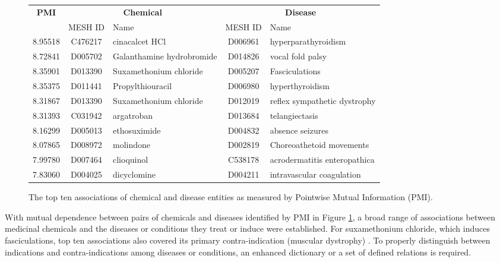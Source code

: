 \documentclass[10pt, oneside]{article}
\begin{document}
\begin{figure}[h]
\begin{center}
\fontsize{9}{11}\selectfont
\begin{tabular}{|*{2}{c|}p{4.5cm}|c|p{4.5cm}|}\hline
 \multirow{2}{*}{\textbf{PMI}} & \multicolumn{2}{c|}{\textbf{Chemical}} & \multicolumn{2}{c|}{\textbf{Disease}} \\ \cline{2-5}
 & MESH ID   & Name                      & MESH ID   & Name                         \\ \hline
 8.95518 & C476217   & cinacalcet HCl            & D006961   & hyperparathyroidism          \\ \hline
 8.72841 & D005702   & Galanthamine hydrobromide & D014826   & vocal fold palsy             \\ \hline
 8.35901 & D013390   & Suxamethonium chloride    & D005207   & Fasciculations               \\ \hline
 8.35375 & D011441   & Propylthiouracil          & D006980   & hyperthyroidism              \\ \hline
 8.31867 & D013390   & Suxamethonium chloride    & D012019   & reflex sympathetic dystrophy \\ \hline
 8.31393 & C031942   & argatroban                & D013684   & telangiectasis               \\ \hline
 8.16299 & D005013   & ethosuximide              & D004832   & absence seizures             \\ \hline
 8.07865 & D008972   & molindone                 & D002819   & Choreoathetoid movements     \\ \hline
 7.99780 & D007464   & clioquinol                & C538178   & acrodermatitis enteropathica \\ \hline
 7.83060 & D004025   & dicyclomine               & D004211   & intravascular coagulation    \\ \hline
\end{tabular}
\caption{\label{fig:pmi} The top ten associations of chemical and disease entities as measured by Pointwise Mutual Information (PMI).}
\end{center}
\end{figure}

With mutual dependence between pairs of chemicals and diseases identified by PMI in Figure \ref{fig:pmi}, a broad range of associations between medicinal chemicals and the diseases or conditions they treat or induce were established. For suxamethonium chloride, which induces fasciculations, top ten associations also covered its primary contra-indication (muscular dystrophy) \cite{suxamethonium}. To properly distinguish between indications and contra-indications among diseases or conditions, an enhanced dictionary or a set of defined relations \cite{kim2005biocontrasts} is required.
\end{document}

